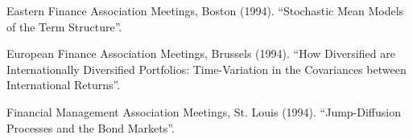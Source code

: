 \documentclass{article}
\begin{document}
\begin{etaremune}
{\item Eastern Finance Association Meetings, Boston (1994).
``Stochastic Mean Models of the Term Structure''. 

\item European Finance Association Meetings, Brussels (1994).
``How Diversified are Internationally Diversified Portfolios:
Time-Variation in the Covariances between International Returns''.

\item Financial Management Association Meetings, St. Louis (1994).
``Jump-Diffusion Processes and the Bond Markets''.
}

\end{etaremune}
\end{document}
